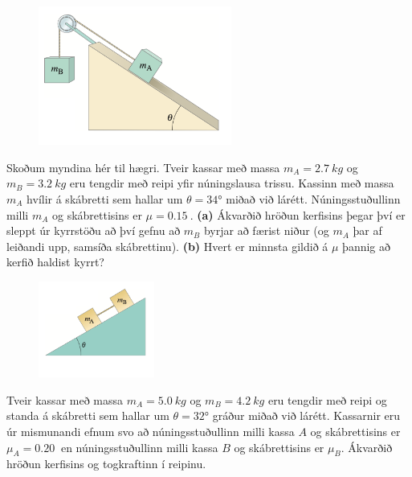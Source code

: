 \begin{enumerate}[label = \textbf{Dæmi \thechapter.\arabic*.}]
\vspace{0.3cm}

\begin{minipage}{\linewidth}
\begin{figure}
\vspace{-1cm}
\includegraphics[width=2.5in]{images/hanger.png}
\end{figure}

\item Skoðum myndina hér til hægri. Tveir kassar með massa $m_A = \SI{2.7}{kg}$ og $m_B = \SI{3.2}{kg}$ eru tengdir með reipi yfir núningslausa trissu. Kassinn með massa $m_A$ hvílir á skábretti sem hallar um $\theta = \ang{34}$ miðað við lárétt.  Núningsstuðullinn milli $m_A$ og skábrettisins er $\mu = \SI{0.15}{}$. \textbf{(a)} Ákvarðið hröðun kerfisins þegar því er sleppt úr kyrrstöðu að því gefnu að $m_B$ byrjar að færist niður (og $m_A$ þar af leiðandi upp, samsíða skábrettinu).  \textbf{(b)} Hvert er minnsta gildið á $\mu$ þannig að kerfið haldist kyrrt?

\end{minipage}

\vspace{0.3cm}

\begin{minipage}{\linewidth}
\begin{figure}
\vspace{-0.5cm}
\includegraphics[width=1.5in]{images/skabr3.png}
\end{figure}

\item Tveir kassar með massa $m_A = \SI{5.0}{kg}$ og $m_B = \SI{4.2}{kg}$ eru tengdir með reipi og standa á skábretti sem hallar um $\theta = \ang{32}$ gráður miðað við lárétt. Kassarnir eru úr mismunandi efnum svo að núningsstuðullinn milli kassa $A$ og skábrettisins er $\mu_A = \SI{0.20}{}$ en núningsstuðullinn milli kassa $B$ og skábrettisins er $\mu_B$. Ákvarðið hröðun kerfisins og togkraftinn í reipinu.
\end{minipage}


\end{enumerate}
